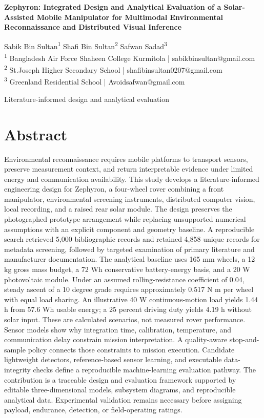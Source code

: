\documentclass[11pt,letterpaper]{article}
\begin{document}
\begin{center}
{\LARGE\bfseries Zephyron: Integrated Design and Analytical Evaluation of a Solar-Assisted Mobile Manipulator for Multimodal Environmental Reconnaissance and Distributed Visual Inference\par}
\vspace{9pt}
Sabik Bin Sultan\textsuperscript{1}   Shafi Bin Sultan\textsuperscript{2}   Safwan Sadad\textsuperscript{3}\\[4pt]
{\small \textsuperscript{1} Bangladesh Air Force Shaheen College Kurmitola | sabikbinsultan@gmail.com\\
\textsuperscript{2} St.Joseph Higher Secondary School | shafibinsultan0207@gmail.com\\
\textsuperscript{3} Greenland Residential School | Avoidsafwan@gmail.com}
\end{center}
Literature-informed design and analytical evaluation

\FloatBarrier
\section*{Abstract}

Environmental reconnaissance requires mobile platforms to transport sensors, preserve measurement context, and return interpretable evidence under limited energy and communication availability. This study develops a literature-informed engineering design for Zephyron, a four-wheel rover combining a front manipulator, environmental screening instruments, distributed computer vision, local recording, and a raised rear solar module. The design preserves the photographed prototype arrangement while replacing unsupported numerical assumptions with an explicit component and geometry baseline. A reproducible search retrieved 5,000 bibliographic records and retained 4,858 unique records for metadata screening, followed by targeted examination of primary literature and manufacturer documentation. The analytical baseline uses 165 mm wheels, a 12 kg gross mass budget, a 72 Wh conservative battery-energy basis, and a 20 W photovoltaic module. Under an assumed rolling-resistance coefficient of 0.04, steady ascent of a 10 degree grade requires approximately 0.517 N m per wheel with equal load sharing. An illustrative 40 W continuous-motion load yields 1.44 h from 57.6 Wh usable energy; a 25 percent driving duty yields 4.19 h without solar input. These are calculated scenarios, not measured rover performance. Sensor models show why integration time, calibration, temperature, and communication delay constrain mission interpretation. A quality-aware stop-and-sample policy connects those constraints to mission execution. Candidate lightweight detectors, reference-based sensor learning, and executable data-integrity checks define a reproducible machine-learning evaluation pathway. The contribution is a traceable design and evaluation framework supported by editable three-dimensional models, subsystem diagrams, and reproducible analytical data. Experimental validation remains necessary before assigning payload, endurance, detection, or field-operating ratings.
\end{document}
